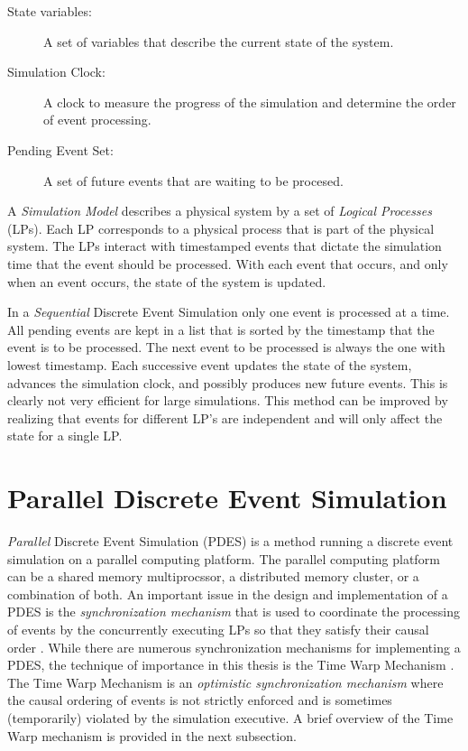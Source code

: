 \documentclass[11pt]{book}
\begin{document}
\begin{description}
\item[State variables: ] A set of variables that describe the current state of the system.
\item[Simulation Clock: ] A clock to measure the progress of the simulation and determine the order
  of event processing.
\item[Pending Event Set: ] A set of future events that are waiting to be procesed.
\end{description}

\noindent
A \emph{Simulation Model} describes a physical system by a set of \emph{Logical Processes} (LPs).
Each LP corresponds to a physical process that is part of the physical system.  The LPs interact
with timestamped events that dictate the simulation time that the event should be processed.  With
each event that occurs, and only when an event occurs, the state of the system is updated.

In a \emph{Sequential} Discrete Event Simulation only one event is processed at a time.  All pending
events are kept in a list that is sorted by the timestamp that the event is to be processed.  The
next event to be processed is always the one with lowest timestamp.  Each successive event updates
the state of the system, advances the simulation clock, and possibly produces new future events.
This is clearly not very efficient for large simulations.  This method can be improved by realizing
that events for different LP's are independent and will only affect the state for a single LP.

\section{Parallel Discrete Event Simulation}

\emph{Parallel} Discrete Event Simulation (PDES) is a method running a discrete event simulation on
a parallel computing platform.  The parallel computing platform can be a shared memory
multiprocssor, a distributed memory cluster, or a combination of both.  An important issue in the
design and implementation of a PDES is the \emph{synchronization mechanism} that is used to
coordinate the processing of events by the concurrently executing LPs so that they satisfy their
causal order \cite{lamport-78}.  While there are numerous synchronization mechanisms for
implementing a PDES, the technique of importance in this thesis is the Time Warp Mechanism
\cite{jefferson-85,fujimoto-90,fujimoto-00}.  The Time Warp Mechanism is an \emph{optimistic
  synchronization mechanism} where the causal ordering of events is not strictly enforced and is
sometimes (temporarily) violated by the simulation executive.  A brief overview of the Time Warp
mechanism is provided in the next subsection.
\end{document}
